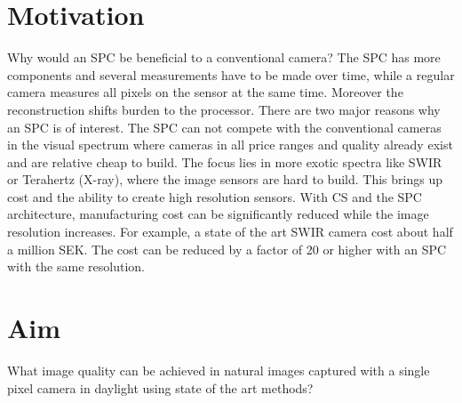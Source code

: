 

   

 
\section{Motivation}
Why would an SPC be beneficial to a conventional camera? The SPC has more components and several measurements have to be made over time, while a regular camera measures all pixels on the sensor at the same time. Moreover the reconstruction shifts burden to the processor. There are two major reasons why an SPC is of interest. The SPC can not compete with the conventional cameras in the visual spectrum where cameras in all price ranges and quality already exist and are relative cheap to build. The focus lies in more exotic spectra like SWIR or Terahertz (X-ray), where the image sensors are hard to build. This brings up cost and the ability to create high resolution sensors. With CS and the SPC architecture, manufacturing cost can be significantly reduced while the image resolution increases. For example, a state of the art SWIR camera cost about half a million SEK. The cost can be reduced by a factor of 20 or higher with an SPC with the same resolution. 

\section{Aim} 
\label{sec:aim}
What image quality can be achieved in natural images captured with a single pixel camera in daylight using state of the art methods?\\[0.1in]  

